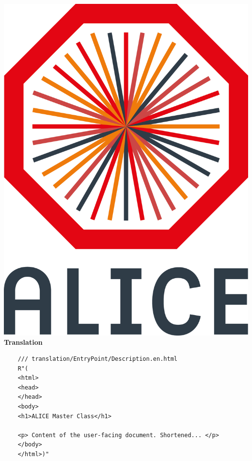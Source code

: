 \documentclass[aspectratio=1610,14pt,dvipsnames]{beamer}
\begin{document}
\begin{frame}[fragile]{\includegraphics[height=0.07\textheight]{2012-Jul-04-4_Color_Logo_CB.png} \hspace{0.2cm}\textbf{Translation}}
  \begin{verbatim}
    /// translation/EntryPoint/Description.en.html
    R"(
    <html>
    <head>
    </head>
    <body>
    <h1>ALICE Master Class</h1>

    <p> Content of the user-facing document. Shortened... </p>
    </body>
    </html>)"
  \end{verbatim}
\end{frame}
\end{document}
